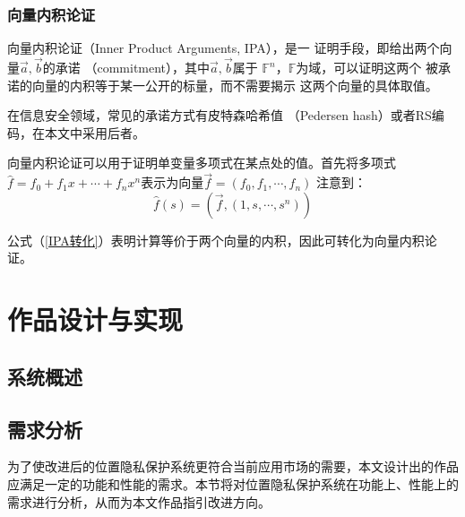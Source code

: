 \documentclass[zihao=-4]{ctexart}
\begin{document}
\subsubsection{向量内积论证}
向量内积论证（Inner Product Arguments, IPA），是一
证明手段，即给出两个向量$\vec{a},\vec{b}$的承诺
（commitment），其中$\vec{a},\vec{b}$属于
$\mathbb{F}^n$，$\mathbb{F}$为域，可以证明这两个
被承诺的向量的内积等于某一公开的标量，而不需要揭示
这两个向量的具体取值。\par
在信息安全领域，常见的承诺方式有皮特森哈希值
（Pedersen hash）或者RS编码，在本文中采用后者。\par
向量内积论证可以用于证明单变量多项式在某点处的值。首先将多项式
$\hat{f}=f_0+f_1x+\cdots+f_nx^n$表示为向量$\vec{f}=(f_0,f_1,\cdots,f_n)$
注意到：
\begin{equation}\hat{f}(s)=(\vec{f},(1,s,\cdots,s^n))\label{IPA转化}\end{equation}\par
公式（\ref{IPA转化}）表明计算等价于两个向量的内积，因此可转化为向量内积论证。




\section{作品设计与实现}
\subsection{系统概述}

\subsection{需求分析}
为了使改进后的位置隐私保护系统更符合当前应用市场的需要，本文设计出的作品应满足一定的功能和性能的需求。本节将对位置隐私保护系统在功能上、性能上的需求进行分析，从而为本文作品指引改进方向。
\end{document}
